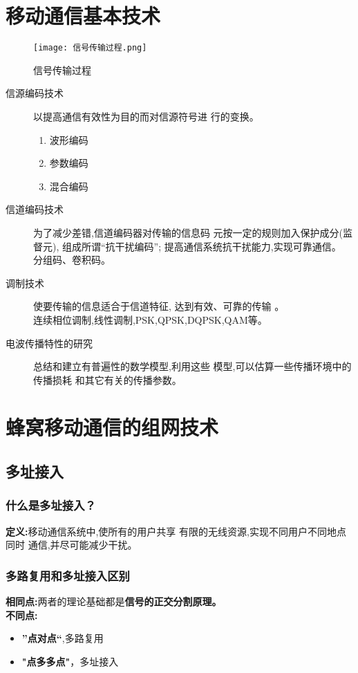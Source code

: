 	\section{移动通信基本技术}
		\begin{figure}[H]
			\centering
			\texttt{[image: 信号传输过程.png]}
			\caption{信号传输过程}
		\end{figure}
	\begin{description}
		\item[信源编码技术
		] 以提高通信有效性为目的而对信源符号进
		行的变换。
		\begin{enumerate}
			\item 波形编码
			\item 参数编码
			\item 混合编码
		\end{enumerate}
		\item[信道编码技术
		] 为了减少差错,信道编码器对传输的信息码
		元按一定的规则加入保护成分(监督元),
		组成所谓“抗干扰编码”;
		提高通信系统抗干扰能力,实现可靠通信。\\分组码、卷积码。
		\item[调制技术
		] 使要传输的信息适合于信道特征,
		达到有效、可靠的传输 。\\连续相位调制,线性调制,PSK,QPSK,DQPSK,QAM等。
		\item[电波传播特性的研究
		]  总结和建立有普遍性的数学模型,利用这些
		模型,可以估算一些传播环境中的传播损耗
		和其它有关的传播参数。
	\end{description}
	\section{蜂窝移动通信的组网技术}
	\subsection{多址接入}
	\subsubsection{什么是多址接入？}
	\textbf{定义:}移动通信系统中,使所有的用户共享
	有限的无线资源,实现不同用户不同地点同时
	通信,并尽可能减少干扰。
	\subsubsection{多路复用和多址接入区别}
	\textbf{相同点:}两者的理论基础都是\textbf{信号的正交分割原理。}\\
	\textbf{不同点:}
	\begin{itemize}
		\item \textbf{”点对点“},多路复用
		\item \textbf{"点多多点"}，多址接入
	\end{itemize}
	
